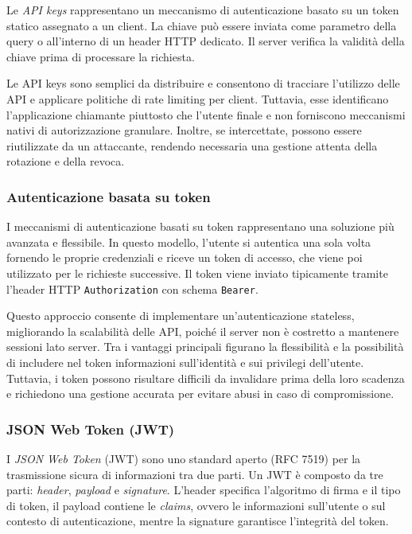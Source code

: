 Le \emph{API keys} rappresentano un meccanismo di autenticazione basato su un token statico assegnato a un client. La chiave può essere inviata come parametro della query o all’interno di un header HTTP dedicato. Il server verifica la validità della chiave prima di processare la richiesta.

Le API keys sono semplici da distribuire e consentono di tracciare l’utilizzo delle API e applicare politiche di rate limiting per client. Tuttavia, esse identificano l’applicazione chiamante piuttosto che l’utente finale e non forniscono meccanismi nativi di autorizzazione granulare. Inoltre, se intercettate, possono essere riutilizzate da un attaccante, rendendo necessaria una gestione attenta della rotazione e della revoca.

\subsubsection{Autenticazione basata su token}

I meccanismi di autenticazione basati su token rappresentano una soluzione più avanzata e flessibile. In questo modello, l’utente si autentica una sola volta fornendo le proprie credenziali e riceve un token di accesso, che viene poi utilizzato per le richieste successive. Il token viene inviato tipicamente tramite l’header HTTP \texttt{Authorization} con schema \texttt{Bearer}.

Questo approccio consente di implementare un’autenticazione stateless, migliorando la scalabilità delle API, poiché il server non è costretto a mantenere sessioni lato server. Tra i vantaggi principali figurano la flessibilità e la possibilità di includere nel token informazioni sull’identità e sui privilegi dell’utente. Tuttavia, i token possono risultare difficili da invalidare prima della loro scadenza e richiedono una gestione accurata per evitare abusi in caso di compromissione.

\subsubsection{JSON Web Token (JWT)}

I \emph{JSON Web Token} (JWT) sono uno standard aperto (RFC 7519) per la trasmissione sicura di informazioni tra due parti. Un JWT è composto da tre parti: \emph{header}, \emph{payload} e \emph{signature}. L’header specifica l’algoritmo di firma e il tipo di token, il payload contiene le \emph{claims}, ovvero le informazioni sull’utente o sul contesto di autenticazione, mentre la signature garantisce l’integrità del token.

